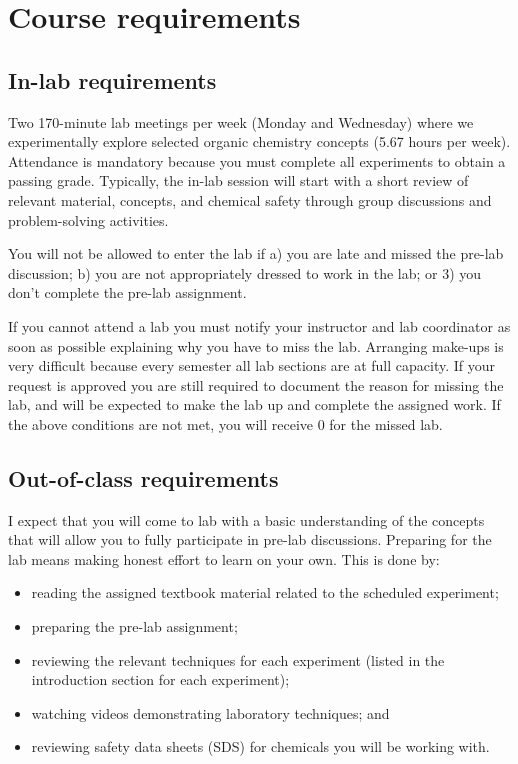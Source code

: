 \hypertarget{course-requirements}{%
\section{Course requirements}\label{course-requirements}}

\hypertarget{in-lab-requirements}{%
\subsection{In-lab requirements}\label{in-lab-requirements}}

Two 170-minute lab meetings per week (Monday and Wednesday) where we
experimentally explore selected organic chemistry concepts (5.67 hours
per week). Attendance is mandatory because you must complete all
experiments to obtain a passing grade. Typically, the in-lab session
will start with a short review of relevant material, concepts, and
chemical safety through group discussions and problem-solving
activities.

You will not be allowed to enter the lab if a) you are late and missed
the pre-lab discussion; b) you are not appropriately dressed to work in
the lab; or 3) you don't complete the pre-lab assignment.

If you cannot attend a lab you must notify your instructor and lab
coordinator as soon as possible explaining why you have to miss the lab.
Arranging make-ups is very difficult because every semester all lab
sections are at full capacity. If your request is approved you are still
required to document the reason for missing the lab, and will be
expected to make the lab up and complete the assigned work. If the above
conditions are not met, you will receive 0 for the missed lab.

\hypertarget{out-of-class-requirements}{%
\subsection{Out-of-class requirements}\label{out-of-class-requirements}}

I expect that you will come to lab with a basic understanding of the
concepts that will allow you to fully participate in pre-lab
discussions. Preparing for the lab means making honest effort to learn
on your own. This is done by:

\begin{itemize}
\tightlist
\item
  reading the assigned textbook material related to the scheduled
  experiment;
\item
  preparing the pre-lab assignment;
\item
  reviewing the relevant techniques for each experiment (listed in the
  introduction section for each experiment);
\item
  watching videos demonstrating laboratory techniques; and
\item
  reviewing safety data sheets (SDS) for chemicals you will be working
  with.
\end{itemize}

